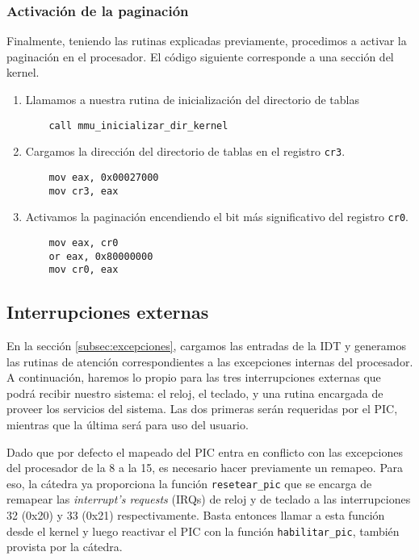 \subsubsection{Activación de la paginación}

Finalmente, teniendo las rutinas explicadas previamente, procedimos a activar la
paginación en el procesador. El código siguiente corresponde a una sección del
kernel.

\begin{enumerate}
	\item Llamamos a nuestra rutina de inicialización del directorio de tablas
	\begin{lstlisting}
	call mmu_inicializar_dir_kernel
	\end{lstlisting}

	\item Cargamos la dirección del directorio de tablas en el registro
		\texttt{cr3}.
	\begin{lstlisting}
	mov eax, 0x00027000
	mov cr3, eax
	\end{lstlisting}

	\item Activamos la paginación encendiendo el bit más significativo del
		registro \texttt{cr0}.
	\begin{lstlisting}
	mov eax, cr0
	or eax, 0x80000000
	mov cr0, eax
	\end{lstlisting}
\end{enumerate}

\subsection{Interrupciones externas}

En la sección \ref{subsec:excepciones}, cargamos las entradas de la IDT y generamos las rutinas de atención correspondientes a las excepciones internas del procesador. A continuación, haremos lo propio para las tres interrupciones externas que podrá recibir nuestro sistema: el reloj, el teclado, y una rutina encargada de proveer los servicios del sistema. Las dos primeras serán requeridas por el PIC, mientras que la última será para uso  del usuario.

Dado que por defecto el mapeado del PIC entra en conflicto con las excepciones del procesador de la 8 a la 15, es necesario hacer previamente un remapeo. Para eso, la cátedra ya proporciona la función \texttt{resetear\_pic} que se encarga de remapear las \textit{interrupt's requests} (IRQs) de reloj y de teclado a las interrupciones 32 (0x20) y 33 (0x21) respectivamente. Basta entonces llamar a esta función desde el kernel y luego reactivar el PIC con la función \texttt{habilitar\_pic}, también provista por la cátedra.

